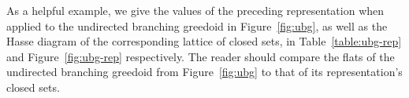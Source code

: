 \documentclass[11pt]{article}
\begin{document}
\begin{figure}
\begin{floatrow}
\end{floatrow}
\end{figure}

\iffalse
As a helpful example, we give the values of the preceding representation when applied to the undirected branching greedoid in Figure~\ref{fig:ubg}, as well as the Hasse diagram of the corresponding lattice of closed sets, in Table~\ref{table:ubg-rep} and Figure~\ref{fig:ubg-rep} respectively.
The reader should compare the flats of the undirected branching greedoid from Figure~\ref{fig:ubg} to that of its representation's closed sets.
\end{document}
